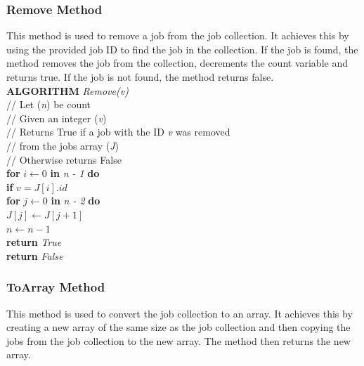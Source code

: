\documentclass[12pt,a4paper]{article}
\begin{document}
			\subsubsection{Remove Method}
				This method is used to remove a job from the job collection. It achieves this by using the 
				provided job ID to find the job in the collection. If the job is found, the method removes the 
				job from the collection, decrements the count variable and returns true. If the job is not found, 
				the method returns false.\\

				\textbf{ALGORITHM} \textit{Remove(v)}\\
				\null\hspace{1cm}// Let (\textit{n}) be count\\
				\null\hspace{1cm}// Given an integer (\textit{v})\\
				\null\hspace{1cm}// Returns True if a job with the ID \textit{v} was removed\\
				\null\hspace{1cm}// from the jobs array (\textit{J})\\
				\null\hspace{1cm}// Otherwise returns False\\
				\null\hspace{1cm}\textbf{for} \textit{$i \gets 0$} \textbf{in} \textit{n - 1} \textbf{do}\\
				\null\hspace{2cm}\textbf{if} \textit{$v = J[i].id$}\\
				\null\hspace{4cm}\textbf{for} \textit{$j \gets 0$} \textbf{in} \textit{n - 2} \textbf{do}\\
				\null\hspace{5cm}\textit{$J[j] \gets J[j + 1]$}\\
				\null\hspace{4cm}\textit{$n \gets n - 1$}\\
				\null\hspace{4cm}\textbf{return} \textit{True}\\
				\null\hspace{1cm}\textbf{return} \textit{False}\\
			
			\newpage
			
			\subsubsection{ToArray Method}
				This method is used to convert the job collection to an array. It achieves this by creating a 
				new array of the same size as the job collection and then copying the jobs from the job 
				collection to the new array. The method then returns the new array.\\
\end{document}

